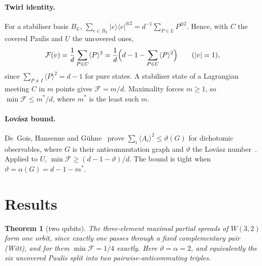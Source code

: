 \documentclass[11pt]{article}
\newtheorem{theorem}{Theorem}
\theoremstyle{remark}\newtheorem*{remark}{Remark}
\newcommand{\F}{\mathcal{F}}
\begin{document}
\paragraph{Twirl identity.} For a stabiliser basis $B_L$, $\sum_{e\in B_L}|e\rangle\langle e|^{\otimes2}=d^{-1}\sum_{P\in L}P^{\otimes2}$.
Hence, with $C$ the covered Paulis and $U$ the uncovered ones,
\begin{equation}
\F(v)=\frac1d\sum_{P\in C}\langle P\rangle^2=\frac1d\Bigl(d-1-\sum_{P\in U}\langle P\rangle^2\Bigr)\qquad(|v|=1),
\end{equation}
since $\sum_{P\ne I}\langle P\rangle^2=d-1$ for pure states. A stabiliser state of a Lagrangian meeting $C$ in $m$ points gives
$\F=m/d$. Maximality forces $m\ge1$, so $\min\F\le m^*/d$, where $m^*$ is the least such $m$.

\paragraph{Lovász bound.} De~Gois, Hansenne and G\"uhne~\cite{dhg} prove $\sum_i\langle A_i\rangle^2\le\vartheta(G)$ for dichotomic
observables, where $G$ is their anticommutation graph and $\vartheta$ the Lovász number~\cite{lovasz}. Applied to $U$,
$\min\F\ge(d-1-\vartheta)/d$. The bound is tight when $\vartheta=\alpha(G)=d-1-m^*$.

\section{Results}
\begin{theorem}[two qubits]\label{t:2}
The three-element maximal partial spreads of $W(3,2)$ form one orbit, since exactly one passes through a fixed complementary pair
(Witt), and for them $\min\F=1/4$ exactly. Here $\vartheta=\alpha=2$, and equivalently the six
uncovered Paulis split into two pairwise-anticommuting triples.
\end{theorem}
\end{document}

